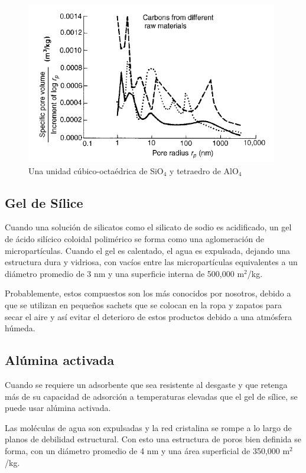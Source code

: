 \documentclass[11pt]{book}
\begin{document}
\begin{figure}[H]
    \centering
    \includegraphics[width=11cm]{img/adsorcion/DistribucionPorosCarbonActivado.PNG}
    \caption{Una unidad cúbico-octaédrica de SiO$_4$ y tetraedro de AlO$_4$}
    \label{fig:distribucionporoscarbonactivado}
\end{figure}

\subsection{Gel de Sílice}

Cuando una solución de silicatos como el silicato de sodio es acidificado, un gel de ácido silícico coloidal polimérico se forma como una aglomeración de micropartículas. Cuando el gel es calentado, el agua es expulsada, dejando una estructura dura y vidriosa, con vacíos entre las micropartículas equivalentes a un diámetro promedio de 3 nm y una superficie interna de 500,000 m$^2$/kg. 

Probablemente, estos compuestos son los más conocidos por nosotros, debido a que se utilizan en pequeños sachets que se colocan en la ropa y zapatos para secar el aire y así evitar el deterioro de estos productos debido a una atmósfera húmeda. 


\subsection{Alúmina activada}

Cuando se requiere un adsorbente que sea resistente al desgaste y que retenga más de su capacidad de adsorción a temperaturas elevadas que el gel de sílice, se puede usar alúmina activada.

Las moléculas de agua son expulsadas y la red cristalina se rompe a lo largo de planos de debilidad estructural. Con esto una estructura de poros bien definida se forma, con un diámetro promedio de 4 nm y una área superficial de 350,000 m$^2$/kg.
\end{document}
